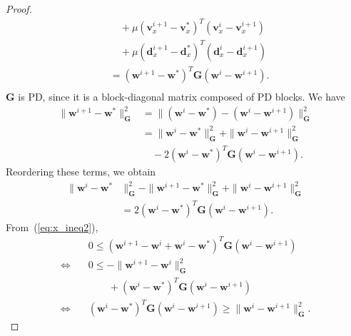 \documentclass[10pt,twocolumn,twoside]{IEEEtran}
\newcommand{\z}{\mathbf{z}} %
\newcommand{\vs}{\mathbf{v}} %
\newcommand{\dv}{\mathbf{d}} %
\newcommand{\wt}{\mathbf{w}} %
\newcommand{\C}{\mathbf{C}} %
\newcommand{\G}{\mathbf{G}} %
\begin{document}
\begin{proof}
\begin{equation}
\begin{aligned}
	& \quad + \mu (\vs_x^{i+1} - \vs_x^*)^T (\vs_x^i - \vs_x^{i+1})\\
	& \quad + \mu (\dv_x^{i+1} - \dv_x^*)^T (\dv_x^i - \dv_x^{i+1})\\
	& = (\wt^{i+1} - \wt^*)^T \G (\wt^i - \wt^{i+1}). \\
	\end{aligned}
	\end{equation}
	$\G$ is PD, since it is a block-diagonal matrix composed of PD blocks. We have
	\begin{equation}
	\begin{aligned}
	\|\wt^{i+1} - \wt^*\|^2_{\G} &= \|(\wt^i - \wt^*) - (\wt^i - \wt^{i+1})\|^2_{\G}\\
	& = \|\wt^i - \wt^*\|^2_{\G} + \|\wt^i - \wt^{i+1}\|^2_{\G} \\
	& \quad - 2 (\wt^i - \wt^*)^T \G (\wt^i - \wt^{i+1}).
	\end{aligned}
	\end{equation}
	Reordering these terms, we obtain
	\begin{equation} \label{eq:reordering}
	\begin{aligned} 
	\|\wt^i - \wt^*&\|^2_{\G} - \|\wt^{i+1}- \wt^*\|^2_{\G} +  \|\wt^i - \wt^{i+1}\|^2_{\G} \\
	& = 2 (\wt^i - \wt^*)^T \G (\wt^i - \wt^{i+1}).
	\end{aligned}
	\end{equation}
	From~(\ref{eq:x_ineq2}),
	\begin{align} 
	&0 \leq (\wt^{i+1} - \wt^i + \wt^i - \wt^*)^T \G (\wt^i - \wt^{i+1}) \nonumber \\
	\Leftrightarrow \quad &0 \leq - \|\wt^{i+1} - \wt^i\|^2_{\G} \nonumber \\
	&\qquad + (\wt^i - \wt^*)^T \G (\wt^i - \wt^{i+1}) \nonumber \\
	\Leftrightarrow \quad &(\wt^i - \wt^*)^T \G (\wt^i - \wt^{i+1}) \geq  \|\wt^i - \wt^{i+1}\|^2_{\G}. \label{eq:ineq3}

\end{align}
\end{proof}
\end{document}
